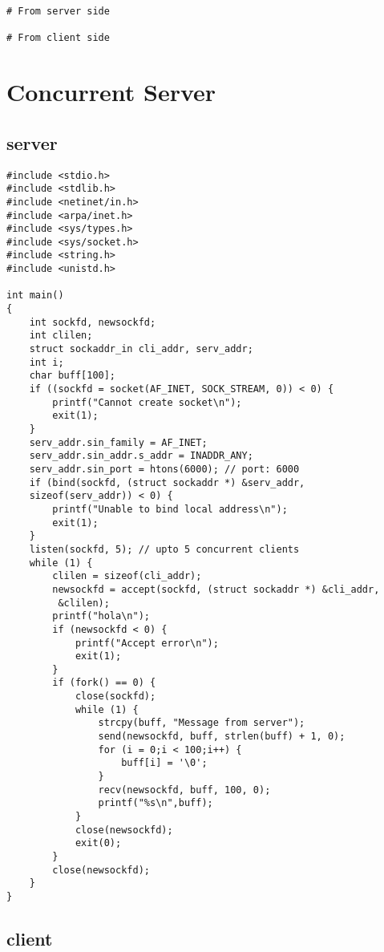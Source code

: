 \documentclass[12pt]{article}
\begin{document}
\begin{lstlisting}
# From server side

# From client side
\end{lstlisting}

\section{Concurrent Server}
\subsection{server}

\begin{lstlisting}
#include <stdio.h>
#include <stdlib.h>
#include <netinet/in.h>
#include <arpa/inet.h>
#include <sys/types.h>
#include <sys/socket.h>
#include <string.h>
#include <unistd.h>

int main()
{
	int sockfd, newsockfd;
	int clilen;
	struct sockaddr_in cli_addr, serv_addr;
	int i;
	char buff[100];
	if ((sockfd = socket(AF_INET, SOCK_STREAM, 0)) < 0) {
		printf("Cannot create socket\n");
		exit(1);
	}
	serv_addr.sin_family = AF_INET;
	serv_addr.sin_addr.s_addr = INADDR_ANY;
	serv_addr.sin_port = htons(6000); // port: 6000
	if (bind(sockfd, (struct sockaddr *) &serv_addr, 
	sizeof(serv_addr)) < 0) {
		printf("Unable to bind local address\n");
		exit(1);
	}
	listen(sockfd, 5); // upto 5 concurrent clients
	while (1) {
		clilen = sizeof(cli_addr);
		newsockfd = accept(sockfd, (struct sockaddr *) &cli_addr,
		 &clilen);
		printf("hola\n");
		if (newsockfd < 0) {
			printf("Accept error\n");
			exit(1);
		}
		if (fork() == 0) {
			close(sockfd);
			while (1) {
				strcpy(buff, "Message from server");
				send(newsockfd, buff, strlen(buff) + 1, 0);
				for (i = 0;i < 100;i++) {
					buff[i] = '\0';
				}
				recv(newsockfd, buff, 100, 0);
				printf("%s\n",buff);
			}
			close(newsockfd);
			exit(0);
		}
		close(newsockfd);
	}
}
\end{lstlisting}

\subsection{client}
\end{document}
